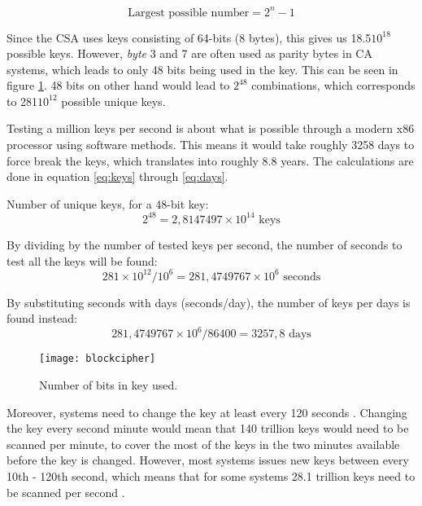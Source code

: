 \begin{equation} 
  \text{Largest possible number} = 2^{n} - 1
  \label{eq:num}
\end{equation}

Since the CSA uses keys consisting of 64-bits (8 bytes), this gives us 
18.5\times$10^{18}$ possible keys. However, \emph{byte} 3 and 
7 are often used as parity bytes in CA systems, which leads to only 48 
bits being used in the key.  This can be seen in figure 
\ref{fig:blockcipher}. 48 bits on other hand would lead to $2^{48}$ 
combinations, which corresponds to 281\times$10^{12}$ possible 
unique keys. 

Testing a million keys per second is about what is possible through a 
modern x86 processor using software methods. This means it would take 
roughly 3258 days to force break the keys, which translates into 
roughly 8.8 years. The calculations are done in equation \ref{eq:keys} 
through \ref{eq:days}. \citep{Breaking:2012}

Number of unique keys, for a 48-bit key:
\begin{equation}
  2^{48} = 2,8147497\times10^{14} \text{ keys}
  \label{eq:keys}
\end{equation}

By dividing by the number of tested keys per second, the number of 
seconds to test all the keys will be found:
\begin{equation}
  281\times10^{12} / 10^{6} = 281,4749767\times10^{6} \text{ seconds}
  \label{eq:seconds}
\end{equation}

By substituting seconds with days \times (seconds/day), the number of keys 
per days is found instead:
\begin{equation}
  281,4749767\times10^{6} / 86400 = 3257,8 \text{ days}
  \label{eq:days}
\end{equation}

\begin{figure}[h!]
  \begin{center}
    \texttt{[image: blockcipher]}
  \end{center}
  \caption{Number of bits in key used.}
  \label{fig:blockcipher}
\end{figure}

Moreover, systems need to change the key at least every 120 seconds 
\citep{Simpson:2009}. Changing the key every second minute would mean 
that 140 trillion keys would need to be scanned per minute, to cover 
the most of the keys in the two minutes available before the key is 
changed. However, most systems issues new keys between every 10th - 
120th second, which means that for some systems 28.1 trillion keys need 
to be scanned per second \citep{Wirt:2004}.

